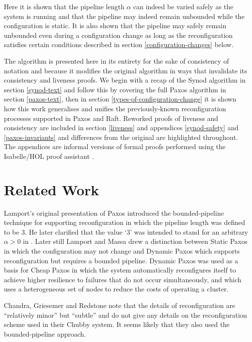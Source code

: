 \documentclass[journal]{IEEEtran}
\begin{document}
Here it is shown that the pipeline length $\alpha$ can indeed be varied safely
as the system is running and that the pipeline may indeed remain unbounded
while the configuration is static. It is also shown that the pipeline may
safely remain unbounded even during a configuration change as long as the
reconfiguration satisfies certain conditions described in section
\ref{configuration-changes} below.

The algorithm is presented here in its entirety for the sake of consistency of
notation and because it modifies the original algorithm in ways that invalidate
its consistency and liveness proofs.  We begin with a recap of the Synod
algorithm in section \ref{synod-text} and follow this by covering the full
Paxos algorithm in section \ref{paxos-text}, then in section
\ref{types-of-configuration-change} it is shown how this work generalises and
unifies the previously-known reconfiguration processes supported in Paxos and
Raft. Reworked proofs of liveness and consistency are included in section
\ref{liveness} and appendices \ref{synod-safety} and \ref{paxos-invariants} and
differences from the original are highlighted throughout. The appendices are
informal versions of formal proofs performed using the Isabelle/HOL proof
assistant \cite{isabelle-hol}.


\section{Related Work}

Lamport's original presentation of Paxos \cite{part-time-parliament} introduced
the bounded-pipeline technique for supporting reconfiguration in which the
pipeline length was defined to be 3. He later clarified that the value `3' was
intended to stand for an arbitrary $\alpha > 0$ in \cite{paxos-made-simple}.
Later still Lamport and Massa \cite{cheap-paxos} drew a distinction between
Static Paxos in which the configuration may not change and Dynamic Paxos which
supports reconfiguration but requires a bounded pipeline.  Dynamic Paxos was
used as a basis for Cheap Paxos in which the system automatically reconfigures
itself to achieve higher resilience to failures that do not occur
simultaneously, and which uses a heterogeneous set of nodes to reduce the costs
of operating a cluster.

Chandra, Griesemer and Redstone \cite{paxos-made-live} note that the details of
reconfiguration are ``relatively minor'' but ``subtle'' and do not give any
details on the reconfiguration scheme used in their Chubby system. It seems
likely that they also used the bounded-pipeline approach.
\end{document}

